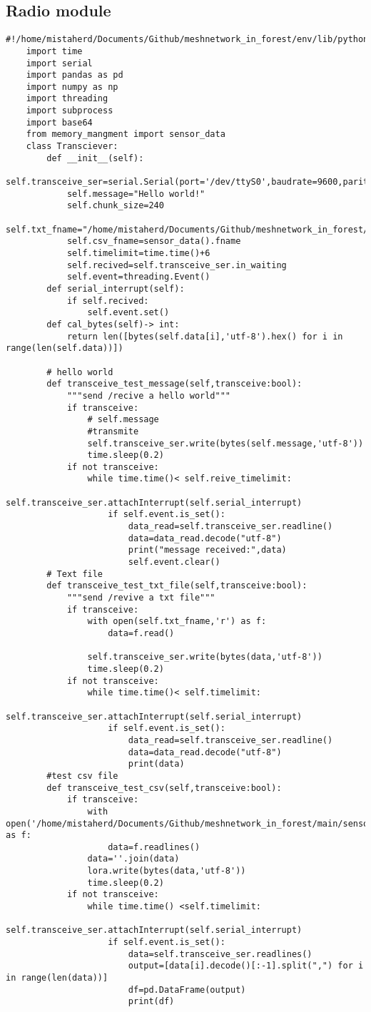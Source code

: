 \subsection{Radio module}
\begin{lstlisting}[style=mystyle,caption={Code for Radio module}]
	#!/home/mistaherd/Documents/Github/meshnetwork_in_forest/env/lib/python3.11
	import time
	import serial
	import pandas as pd
	import numpy as np
	import threading
	import subprocess
	import base64
	from memory_mangment import sensor_data
	class Transciever:
		def __init__(self):
			self.transceive_ser=serial.Serial(port='/dev/ttyS0',baudrate=9600,parity=serial.PARITY_NONE,stopbits=serial.STOPBITS_ONE,bytesize=serial.EIGHTBITS,timeout=1)
			self.message="Hello world!"
			self.chunk_size=240
			self.txt_fname="/home/mistaherd/Documents/Github/meshnetwork_in_forest/Tests/transmited_text.txt"
			self.csv_fname=sensor_data().fname
			self.timelimit=time.time()+6
			self.recived=self.transceive_ser.in_waiting
			self.event=threading.Event()
		def serial_interrupt(self):
			if self.recived:
				self.event.set()
		def cal_bytes(self)-> int:
			return len([bytes(self.data[i],'utf-8').hex() for i in range(len(self.data))])

		# hello world
		def transceive_test_message(self,transceive:bool):
			"""send /recive a hello world"""
			if transceive:
				# self.message
				#transmite
				self.transceive_ser.write(bytes(self.message,'utf-8'))
				time.sleep(0.2)
			if not transceive:
				while time.time()< self.reive_timelimit:
					self.transceive_ser.attachInterrupt(self.serial_interrupt)
					if self.event.is_set():
						data_read=self.transceive_ser.readline()
						data=data_read.decode("utf-8")
						print("message received:",data)
						self.event.clear()
		# Text file
		def transceive_test_txt_file(self,transceive:bool):
			"""send /revive a txt file"""
			if transceive:
				with open(self.txt_fname,'r') as f:
					data=f.read()

				self.transceive_ser.write(bytes(data,'utf-8'))
				time.sleep(0.2)
			if not transceive:
				while time.time()< self.timelimit:
					self.transceive_ser.attachInterrupt(self.serial_interrupt)
					if self.event.is_set():
						data_read=self.transceive_ser.readline()
						data=data_read.decode("utf-8")
						print(data)
		#test csv file
		def transceive_test_csv(self,transceive:bool):
			if transceive:
				with open('/home/mistaherd/Documents/Github/meshnetwork_in_forest/main/sensor_data.csv','r') as f:
					data=f.readlines()
				data=''.join(data)
				lora.write(bytes(data,'utf-8'))
				time.sleep(0.2)
			if not transceive:
				while time.time() <self.timelimit:
					self.transceive_ser.attachInterrupt(self.serial_interrupt)
					if self.event.is_set():
						data=self.transceive_ser.readlines()
						output=[data[i].decode()[:-1].split(",") for i in range(len(data))]
						df=pd.DataFrame(output)
						print(df)


\end{lstlisting}
